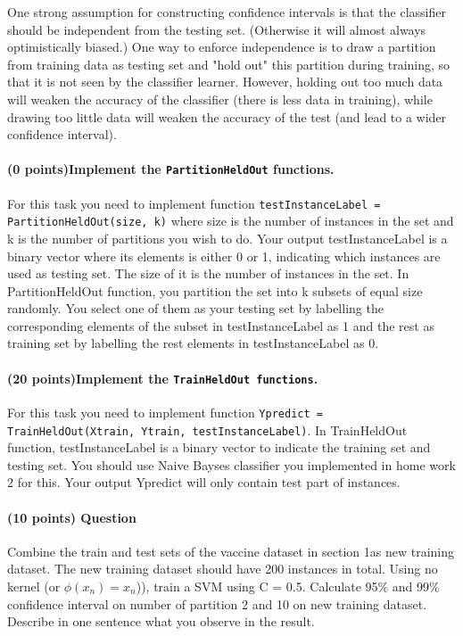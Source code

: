 \documentclass[11pt]{article}
\begin{document}
One strong assumption for constructing confidence intervals is that the classifier should be independent from the testing set. (Otherwise it will almost always optimistically biased.)  \newline
One way to enforce independence is to draw a partition from training data as testing set and "hold out" this partition during training, so that it is not seen by the classifier learner. However, holding out too much data will weaken the accuracy of the classifier (there is less data in training), while drawing too little data will weaken the accuracy of the test (and lead to a wider confidence interval). 

\paragraph {(0 points)Implement the \texttt{PartitionHeldOut} functions.} For this task you need to implement function   \texttt{testInstanceLabel = PartitionHeldOut(size, k)} where size is the number of instances in the set and k is the number of partitions you wish to do.  Your output testInstanceLabel is a binary vector where its elements is either 0 or 1, indicating which instances are used as testing set. The size of it is the number of instances in the set.
In PartitionHeldOut function, you partition the set into k subsets of equal size randomly. You select one of them as your testing set by labelling the corresponding elements of the subset in testInstanceLabel as 1 and the rest as training set by labelling the rest elements in testInstanceLabel as 0.

\paragraph {(20 points)Implement the  \texttt{TrainHeldOut functions}.} For this task you need to implement function   \texttt{Ypredict = TrainHeldOut(Xtrain, Ytrain, testInstanceLabel)}. In TrainHeldOut function, testInstanceLabel is a binary vector to indicate the training set and testing set. You should use Naive Bayses classifier you implemented in home work 2 for this. Your output Ypredict will only contain test part of instances. \newline

\paragraph{(10 points) Question} Combine the train and test sets of the vaccine dataset in section 1as new training dataset. The new training dataset should have 200 instances in total. Using no kernel (or $\phi $$(x_n) = x_n$)), train a SVM using C = 0.5. Calculate 95\% and 99\% confidence interval on number of partition 2 and 10 on new training dataset. Describe in one sentence what you observe in the result.
\end{document}
